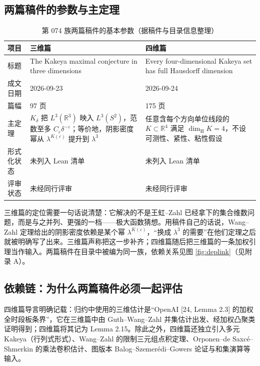 \subsection{两篇稿件的参数与主定理}

\begin{table}[t]
\centering
\caption{第 074 族两篇稿件的基本参数（据稿件与目录信息整理）}
\label{tab:ms-params}
\footnotesize
\begin{tabularx}{\textwidth}{@{}L{2.5cm}L{2.6cm}Y@{}}
\toprule
{}\textbf{项目} & \textbf{三维篇} & \textbf{四维篇} \\
\midrule
标题 & The Kakeya maximal conjecture in three dimensions & Every four-dimensional Kakeya set has full Hausdorff dimension \\
成文日期 & 2026-09-23 & 2026-09-24 \\
篇幅 & 97 页 & 175 页 \\
主定理 & $K_\delta$ 把 $L^3(\mathbb{R}^3)$ 映入 $L^3(S^2)$，范数至多 $C_\varepsilon\delta^{-\varepsilon}$；等价地，阴影密度幂从 $\lambda^{K(\varepsilon)}$ 提升到 $\lambda^{3}$ & 任意含每个方向单位线段的 $K\subset\mathbb{R}^4$ 满足 $\dim_{\mathrm{H}}K=4$，不设可测性、紧性、粘性假设 \\
形式化状态 & 未列入 Lean 清单 & 未列入 Lean 清单 \\
评审状态 & 未经同行评审 & 未经同行评审 \\
\bottomrule
\end{tabularx}
\end{table}

三维篇的定位需要一句话说清楚：它解决的不是王虹--Zahl 已经拿下的集合维数问题，而是与之并列、更强的一档——极大函数猜想。用稿件自己的话说，Wang--Zahl 定理给出的阴影密度依赖是某个幂 $\lambda^{K(\varepsilon)}$，“换成 $\lambda^{3}$ 的需要”在他们定理之后就被明确写了出来。三维篇声称把这一步补齐；四维篇随后把三维篇的一条加权引理当作输入。两篇稿件在目录中被编为同一族，依赖关系见图 \ref{fig:deplink}（见附录 A）。

\subsection{依赖链：为什么两篇稿件必须一起评估}

\begin{evbox}[证据：依赖链的关键节点]
四维篇导言明确记载：归约中使用的三维估计是“OpenAI [24, Lemma 2.3] 的加权全时段板条界”，它在三维篇中由 Guth--Wang--Zahl 并集估计出发、经加权凸聚类证明得到；四维篇将其记为 Lemma 2.15。除此之外，四维篇还独立引入多元 Kakeya（行列式形式）、Wang--Zahl 的限制三元组点积定理、Orponen--de Saxc\'e--Shmerkin 的乘法卷积估计、图版本 Balog--Szemer\'edi--Gowers 论证与和集演算等输入。
\end{evbox}


